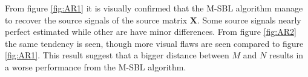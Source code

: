 \noindent
From figure \ref{fig:AR1} it is visually confirmed that the M-SBL algorithm manage to recover the source signals of the source matrix $\mathbf{X}$. 
Some source signals nearly perfect estimated while other are have minor differences. 
From figure \ref{fig:AR2} the same tendency is seen, though more visual flaws are seen compared to figure \ref{fig:AR1}. 
This result suggest that a bigger distance between $M$ and $N$ results in a worse performance from the M-SBL algorithm.        

% 






 
